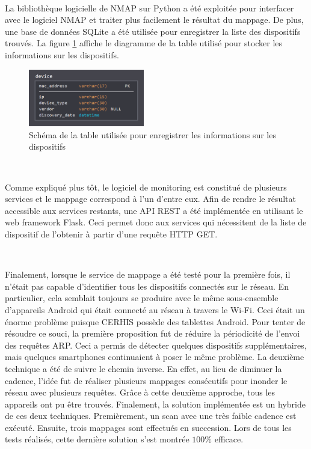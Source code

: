 ~

\noindent
La bibliothèque logicielle de NMAP sur Python a été exploitée pour interfacer avec le logiciel NMAP et traiter plus facilement le résultat du mappage. De plus, une base de données SQLite a été utilisée pour enregistrer la liste des dispositifs trouvés. La figure \ref{fig:db_device} affiche le diagramme de la table utilisé pour stocker les informations sur les dispositifs.

\begin{figure}[ht!]
  \centering
  \includegraphics[width=0.45\textwidth]{img/app/device_db.png}
  \caption{Schéma de la table utilisée pour enregistrer les informations sur les dispositifs}
  \label{fig:db_device}
\end{figure}

~

\noindent
Comme expliqué plus tôt, le logiciel de monitoring est constitué de plusieurs services et le mappage correspond à l'un d'entre eux. Afin de rendre le résultat accessible aux services restants, une API REST a été implémentée en utilisant le web framework Flask. Ceci permet donc aux services qui nécessitent de la liste de dispositif de l’obtenir à partir d’une requête HTTP GET.

~

\noindent
Finalement, lorsque le service de mappage a été testé pour la première fois, il n’était pas capable d’identifier tous les dispositifs connectés sur le réseau. En particulier, cela semblait toujours se produire avec le même sous-ensemble d'appareils Android qui était connecté au réseau à travers le Wi-Fi. Ceci était un énorme problème puisque CERHIS possède des tablettes Android. Pour tenter de résoudre ce souci, la première proposition fut de réduire la périodicité de l'envoi des requêtes ARP. Ceci a permis de détecter quelques dispositifs supplémentaires, mais quelques smartphones continuaient à poser le même problème. La deuxième technique a été de suivre le chemin inverse. En effet, au lieu de diminuer la cadence, l’idée fut de réaliser plusieurs mappages consécutifs pour inonder le réseau avec plusieurs requêtes. Grâce à cette deuxième approche, tous les appareils ont pu être trouvés. Finalement, la solution implémentée est un hybride de ces deux techniques. Premièrement, un scan avec une très faible cadence est exécuté. Ensuite, trois mappages sont effectués en succession. Lors de tous les tests réalisés, cette dernière solution s’est montrée $100\%$ efficace.

